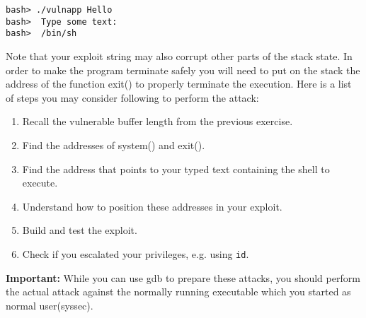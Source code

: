 \documentclass[a4paper,11pt]{article}
\begin{document}
\begin{verbatim}
bash> ./vulnapp Hello
bash>  Type some text:
bash>  /bin/sh
\end{verbatim}

Note that your exploit string may also corrupt other parts of the
stack state. In order to make the program terminate safely you will
need to put on the stack the address of the function exit() to
properly terminate the execution. Here is a list of steps you may
consider following to perform the attack:

\begin{enumerate}
\item Recall the vulnerable buffer length from the previous exercise.
  \item Find the addresses of system() and exit().
  \item Find the address that points to your typed text containing the shell to
  execute.
  \item Understand how to position these addresses in your exploit.
  \item Build and test the exploit.
  \item Check if you escalated your privileges, e.g. using \texttt{id}.
\end{enumerate}

\textbf{Important:} While you can use gdb to prepare these attacks, you should
perform the actual attack against the normally running executable which you
started as normal user(syssec).

\newpage
\end{document}
